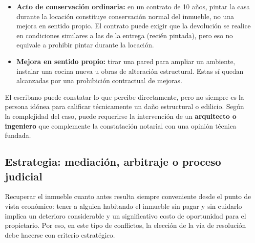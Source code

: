 \documentclass[12pt,oneside]{book}
\begin{document}
\begin{itemize}
    \item \textbf{Acto de conservación ordinaria:} en un contrato de
    10 años, pintar la casa durante la locación constituye conservación
    normal del inmueble, no una mejora en sentido propio. El contrato
    puede exigir que la devolución se realice en condiciones similares
    a las de la entrega (recién pintada), pero eso no equivale a prohibir
    pintar durante la locación.
    \item \textbf{Mejora en sentido propio:} tirar una pared para ampliar
    un ambiente, instalar una cocina nueva u obras de alteración
    estructural. Estas sí quedan alcanzadas por una prohibición
    contractual de mejoras.
\end{itemize}

\begin{note}
El escribano puede constatar lo que percibe directamente, pero no
siempre es la persona idónea para calificar técnicamente un daño
estructural o edilicio. Según la complejidad del caso, puede requerirse
la intervención de un \textbf{arquitecto o ingeniero} que complemente
la constatación notarial con una opinión técnica fundada.
\end{note}

\subsection{Estrategia: mediaci\'on, arbitraje o proceso judicial}

Recuperar el inmueble cuanto antes resulta siempre conveniente desde
el punto de vista económico: tener a alguien habitando el inmueble sin
pagar y sin cuidarlo implica un deterioro considerable y un significativo
costo de oportunidad para el propietario. Por eso, en este tipo de
conflictos, la elección de la vía de resolución debe hacerse con
criterio estratégico.
\end{document}

